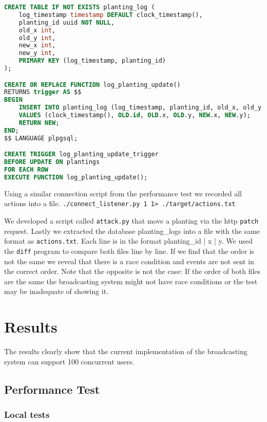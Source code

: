 \documentclass[final,draft,oneside]{vutinfth}
\begin{document}
\begin{lstlisting}[language=sql]
CREATE TABLE IF NOT EXISTS planting_log (
    log_timestamp timestamp DEFAULT clock_timestamp(),
    planting_id uuid NOT NULL,
    old_x int,
    old_y int,
    new_x int,
    new_y int,
    PRIMARY KEY (log_timestamp, planting_id)
);

CREATE OR REPLACE FUNCTION log_planting_update()
RETURNS trigger AS $$
BEGIN
    INSERT INTO planting_log (log_timestamp, planting_id, old_x, old_y, new_x, new_y)
    VALUES (clock_timestamp(), OLD.id, OLD.x, OLD.y, NEW.x, NEW.y);
    RETURN NEW;
END;
$$ LANGUAGE plpgsql;

CREATE TRIGGER log_planting_update_trigger
BEFORE UPDATE ON plantings
FOR EACH ROW
EXECUTE FUNCTION log_planting_update();
\end{lstlisting}

Using a similar connection script from the performance test we recorded all actions into a file. \texttt{./connect\_listener.py 1 1> ./target/actions.txt}

We developed a script called \texttt{attack.py} that move a planting via the \gls{http} \texttt{patch} request.
Lastly we extracted the database planting\_logs into a file with the same format as \texttt{actions.txt}.
Each line is in the format planting\_id | x | y.
We used the \texttt{diff} program to compare both files line by line.
If we find that the order is not the same we reveal that there is a race condition and events are not sent in the correct order. 
Note that the opposite is not the case: If the order of both files are the same the broadcasting system might not have race conditions or the test may be inadequate of showing it.

\chapter{Results}

The results clearly show that the current implementation of the broadcasting system can support 100 concurrent users.

\section{Performance Test}
\subsection{Local tests}
\end{document}
